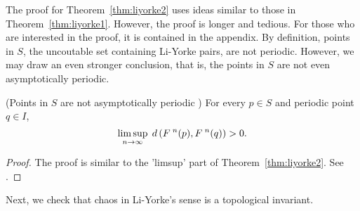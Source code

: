 \documentclass[10pt,draft,twoside]{book}
\begin{document}
The proof for Theorem~\ref{thm:liyorke2} uses ideas similar to those in Theorem~\ref{thm:liyorke1}.
However, the proof is longer and tedious.
For those who are interested in the proof, it is contained in the appendix.
By definition, points in $S$, the uncoutable set containing Li-Yorke pairs, are not periodic.
However, we may draw an even stronger conclusion, that is, the points in $S$ are not even asymptotically periodic.
\begin{theorem}
  (Points in $S$ are not asymptotically periodic \citep{li-yorke})
  For every $p \in S$ and periodic point $q \in I$,
  \begin{equation*}
    \limsup\limits_{n \to \infty}\; d\left( F^{\;n}(p) , F^{\;n}(q) \right) > 0.
  \end{equation*}
  \label{thm:liyorke3}
  \begin{proof}
    The proof is similar to the 'limsup' part of Theorem~\ref{thm:liyorke2}.
    See \citet{li-yorke}.
  \end{proof}
\end{theorem}
Next, we check that chaos in Li-Yorke's sense is a topological invariant.
\end{document}
